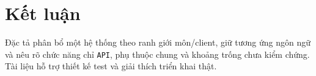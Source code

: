 \clearpage
\section{Kết luận}\label{sec:srs-26}
Đặc tả phân bổ một hệ thống theo ranh giới môn/\allowbreak{}client, giữ tương ứng ngôn ngữ và nêu rõ chức năng chỉ \texttt{API}, phụ thuộc chung và khoảng trống chưa kiểm chứng. Tài liệu hỗ trợ thiết kế test và giải thích triển khai thật.
